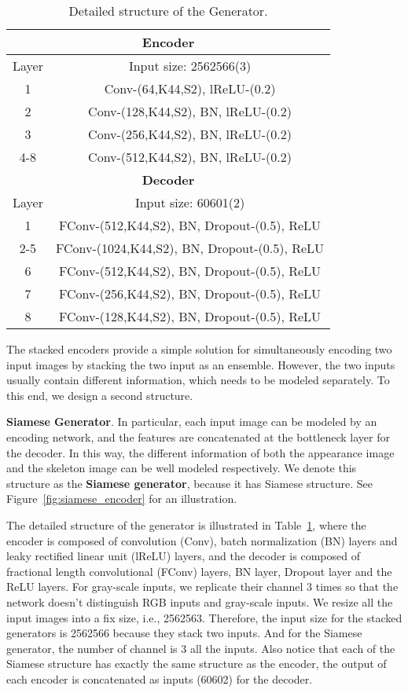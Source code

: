 \documentclass[journal]{IEEEtran}
\begin{document}
\begin{table}[]
\centering
\caption{Detailed structure of the Generator.}
\label{generator}
\begin{tabular}{|c|c|}
\hline
\multicolumn{2}{|c|}{\textbf{Encoder}}                \\ \hline
Layer & Input size: 2562566(3)                       \\ \hline
1     & Conv-(64,K44,S2), lReLU-(0.2)                   \\
2     & Conv-(128,K44,S2), BN, lReLU-(0.2)                  \\
3     & Conv-(256,K44,S2), BN, lReLU-(0.2)                  \\
4-8   & Conv-(512,K44,S2), BN, lReLU-(0.2)                  \\ \hline
\multicolumn{2}{|c|}{\textbf{Decoder}}                \\ \hline
Layer & Input size: 60601(2)                            \\ \hline
1     & FConv-(512,K44,S2), BN, Dropout-(0.5), ReLU  \\
2-5   & FConv-(1024,K44,S2), BN, Dropout-(0.5), ReLU \\
6     & FConv-(512,K44,S2), BN, Dropout-(0.5), ReLU  \\
7     & FConv-(256,K44,S2), BN, Dropout-(0.5), ReLU  \\
8     & FConv-(128,K44,S2), BN, Dropout-(0.5), ReLU  \\ \hline
\end{tabular}
\end{table}

The stacked encoders provide a simple solution for simultaneously encoding two input images by stacking the two input as an ensemble. However, the two inputs usually contain different information, which needs to be modeled separately. To this end, we design a second structure.

\textbf{Siamese Generator}. In particular, each input image can be modeled by an encoding network, and the features are concatenated at the bottleneck layer for the decoder. In this way, the different information of both the appearance image and the skeleton image can be well modeled respectively.
We denote this structure as the \textbf{Siamese generator}, because it has Siamese structure. See Figure~\ref{fig:siamese_encoder} for an illustration.

The detailed structure of the generator is illustrated in Table~\ref{generator}, where the encoder is composed of convolution (Conv), batch normalization (BN) layers and leaky rectified linear unit (lReLU) layers, and the decoder is composed of fractional length convolutional (FConv) layers, BN layer, Dropout layer and the ReLU layers.
For gray-scale inputs, we replicate their channel 3 times so that the network doesn't distinguish RGB inputs and gray-scale inputs.
We resize all the input images into a fix size, i.e., 2562563. Therefore, the input size for the stacked generators is 2562566 because they stack two inputs. And for the Siamese generator, the number of channel is 3 all the inputs.  Also notice that each of the Siamese structure has exactly the same structure as the encoder, the output of each encoder is concatenated as inputs (60602) for the decoder.
\end{document}
